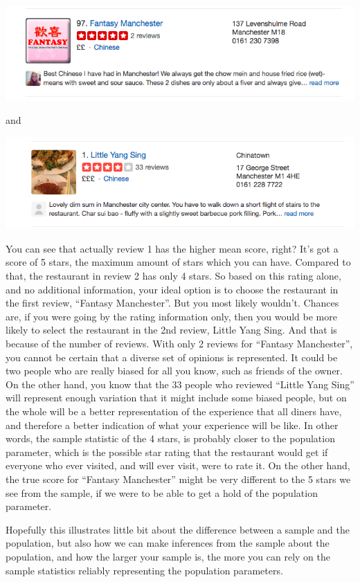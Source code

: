 \documentclass[
]{book}
\begin{document}
\includegraphics{imgs/review_1.png}

and

\includegraphics{imgs/review_2.png}

You can see that actually review 1 has the higher mean score, right? It's got a score of 5 stars, the maximum amount of stars which you can have. Compared to that, the restaurant in review 2 has only 4 stars. So based on this rating alone, and no additional information, your ideal option is to choose the restaurant in the first review, ``Fantasy Manchester''. But you most likely wouldn't. Chances are, if you were going by the rating information only, then you would be more likely to select the restaurant in the 2nd review, Little Yang Sing. And that is because of the number of reviews. With only 2 reviews for ``Fantasy Manchester'', you cannot be certain that a diverse set of opinions is represented. It could be two people who are really biased for all you know, such as friends of the owner. On the other hand, you know that the 33 people who reviewed ``Little Yang Sing'' will represent enough variation that it might include some biased people, but on the whole will be a better representation of the experience that all diners have, and therefore a better indication of what your experience will be like. In other words, the sample statistic of the 4 stars, is probably closer to the population parameter, which is the possible star rating that the restaurant would get if everyone who ever visited, and will ever visit, were to rate it. On the other hand, the true score for ``Fantasy Manchester'' might be very different to the 5 stars we see from the sample, if we were to be able to get a hold of the population parameter.

Hopefully this illustrates little bit about the difference between a sample and the population, but also how we can make inferences from the sample about the population, and how the larger your sample is, the more you can rely on the sample statistics reliably representing the population parameters.
\end{document}
